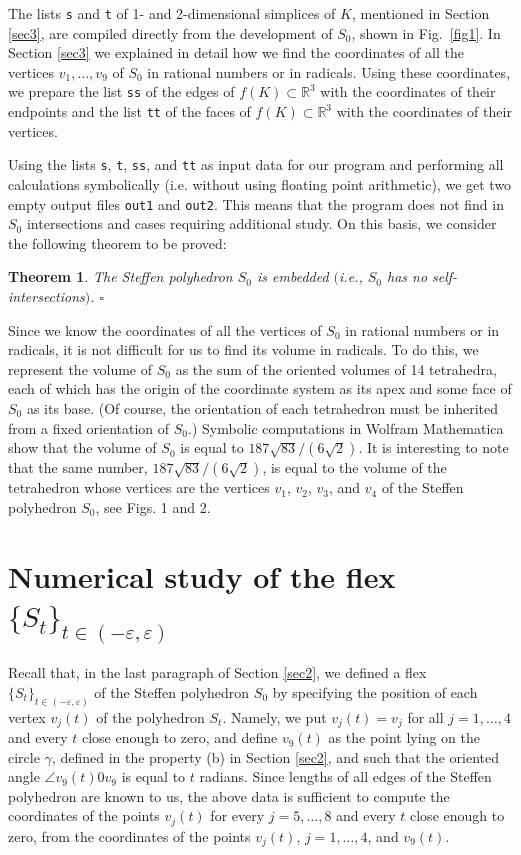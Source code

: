\documentclass[12pt, reqno]{amsart}
\newtheorem{thrm}{Theorem}
\begin{document}
The lists \texttt{s} and \texttt{t}  of 1- and 2-dimensional simplices of 
$K$, 
mentioned in Section \ref{sec3}, are compiled directly from the development of 
$S_0$,
shown in Fig.~\ref{fig1}.
In Section \ref{sec3} we explained in detail how we find the coordinates of 
all the vertices
$v_1,\dots,v_9$ 
of 
$S_0$
in rational numbers or in radicals.
Using these coordinates, we prepare the list \texttt{ss} of the edges of 
$f(K)\subset\mathbb{R}^3$
with the coordinates of their endpoints and the list \texttt{tt} of the faces of 
$f(K)\subset\mathbb{R}^3$
with the coordinates of their vertices.

Using the lists \texttt{s}, \texttt{t}, \texttt{ss}, and \texttt{tt} as
input data for our program and performing all calculations symbolically 
(i.e. without using floating point arithmetic), we get two empty output files
\texttt{out1} and \texttt{out2}.
This means that the program does not find 
in 
$S_0$
intersections and cases requiring additional study.
On this basis, we consider the following theorem to be proved:

\begin{thrm} 
The Steffen polyhedron 
$S_0$ 
is embedded $($i.e., $S_0$ has no self-intersections$)$. \hfill$\square$
\end{thrm}

Since we know the coordinates of all the vertices of
$S_0$ 
in rational numbers or in radicals, it is not difficult for us to 
find its volume in radicals.
To do this, we represent the volume of 
$S_0$ 
as the sum of the oriented volumes of 14 tetrahedra, each of which has the 
origin of the coordinate system as its apex and some face of 
$S_0$
as its base. 
(Of course, the orientation of each tetrahedron must be inherited from 
a fixed orientation of 
$S_0$.)
Symbolic computations in Wolfram Mathematica show that the volume of 
$S_0$ 
is equal to 
$187\sqrt{83}/(6\sqrt{2})$. 
It is interesting to note that the same number, $187\sqrt{83}/(6\sqrt{2})$, 
is equal to the volume of the tetrahedron whose vertices are the vertices
$v_1$, $v_2$, $v_3$, 
and
$v_4$  
of the Steffen polyhedron 
$S_0$, see Figs. 1 and 2.

\section{Numerical study of the flex $\{S_t\}_{t\in (-\varepsilon,\varepsilon)}$}\label{sec5} 

Recall that, in the last paragraph of Section \ref{sec2}, we
defined a flex 
$\{S_t \}_{t\in(-\varepsilon,\varepsilon)}$ 
of the Steffen polyhedron 
$S_0$
by specifying the position of each vertex
$v_j(t)$
of the polyhedron
$S_t$.
Namely, we put
$v_j(t)=v_j$
for all
$j=1,\dots,4$
and every $t$ close enough to zero, and define 
$v_9(t)$ 
as the point lying on the circle
$\gamma$,
defined in the property (b) in Section \ref{sec2}, and such that the oriented angle 
$\angle v_9(t)0v_9$
is equal to
$t$ 
radians.
Since lengths of all edges of the Steffen polyhedron are known to us, the above data 
is sufficient to compute the coordinates of the points 
$v_j(t)$ 
for every
$j=5,\dots,8$ 
and every
$t$ 
close enough to zero, from the coordinates of the points 
$v_j(t)$, $j=1,\dots,4$, 
and
$v_9(t)$.
\end{document}
